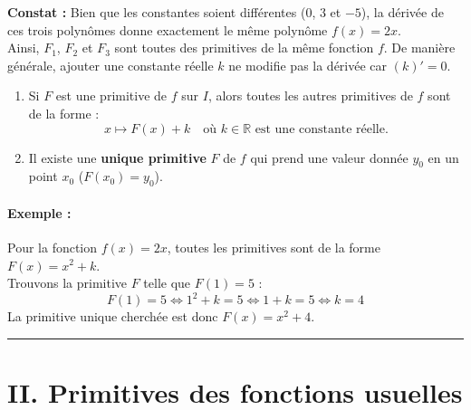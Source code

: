 \documentclass[12pt,a4paper]{article}
\begin{document}
\textbf{Constat :} Bien que les constantes soient différentes ($0$, $3$ et $-5$), la dérivée de ces trois polynômes donne exactement le même polynôme $f(x) = 2x$.\\
Ainsi, $F_1$, $F_2$ et $F_3$ sont toutes des primitives de la même fonction $f$. De manière générale, ajouter une constante réelle $k$ ne modifie pas la dérivée car $(k)' = 0$.

\vspace{0.2cm}

\begin{tcolorbox}[colback=red!5!white,colframe=myred,title=\textbf{Propriétés}]
\begin{enumerate}[label=\arabic*.]
    \item Si $F$ est une primitive de $f$ sur $I$, alors toutes les autres primitives de $f$ sont de la forme :
    \[
    x \mapsto F(x) + k \quad \text{où } k \in \mathbb{R} \text{ est une constante réelle.}
    \]
    \item Il existe une \textbf{unique primitive} $F$ de $f$ qui prend une valeur donnée $y_0$ en un point $x_0$ ($F(x_0) = y_0$).
\end{enumerate}
\end{tcolorbox}

\paragraph{Exemple :}
Pour la fonction $f(x) = 2x$, toutes les primitives sont de la forme $F(x) = x^2 + k$.\\
Trouvons la primitive $F$ telle que $F(1) = 5$ :
\[
F(1) = 5 \iff 1^2 + k = 5 \iff 1 + k = 5 \iff k = 4
\]
La primitive unique cherchée est donc $F(x) = x^2 + 4$.

\vspace{0.3cm}
\hrule
\vspace{0.3cm}


\section*{\color{myred}II. Primitives des fonctions usuelles}
\end{document}
